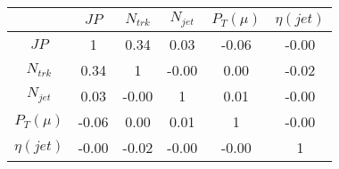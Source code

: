 \begin{tabular}{|c|c|c|c|c|c|} 
\hline
 & $JP$ & $N_{trk}$ & $N_{jet}$ & $P_{T} (\mu)$ & $\eta (jet)$ \\ \hline
$JP$ & 1 & 0.34 & 0.03 & -0.06 & -0.00 \\
$N_{trk}$ & 0.34 & 1 & -0.00 & 0.00 & -0.02 \\
$N_{jet}$ & 0.03 & -0.00 & 1 & 0.01 & -0.00 \\
$P_{T} (\mu)$ & -0.06 & 0.00 & 0.01 & 1 & -0.00 \\
$\eta (jet)$ & -0.00 & -0.02 & -0.00 & -0.00 & 1 \\
\hline 
\end{tabular} 



